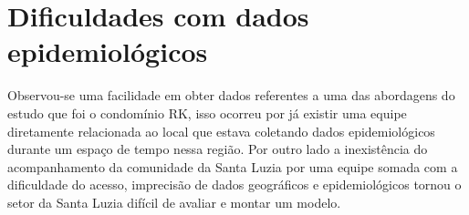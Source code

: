 \section{Dificuldades com dados epidemiológicos}

Observou-se uma facilidade em obter dados referentes a uma das abordagens do estudo que foi o condomínio RK, isso ocorreu por já existir uma equipe diretamente relacionada ao local que estava coletando dados epidemiológicos durante um espaço de tempo nessa região. Por outro lado a inexistência do acompanhamento da comunidade da Santa Luzia por uma equipe somada com a dificuldade do acesso, imprecisão de dados geográficos e epidemiológicos tornou o setor da Santa Luzia difícil de avaliar e montar um modelo.





